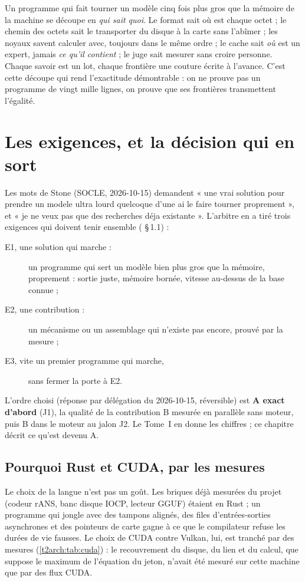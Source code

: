 \begin{enbref}
Un programme qui fait tourner un modèle cinq fois plus gros que la mémoire de la machine se découpe en \emph{qui sait quoi}. Le format sait où est chaque octet ; le chemin des octets sait le transporter du disque à la carte sans l'abîmer ; les noyaux savent calculer avec, toujours dans le même ordre ; le cache sait \emph{où} est un expert, jamais \emph{ce qu'il contient} ; le juge sait mesurer sans croire personne. Chaque savoir est un lot, chaque frontière une couture écrite à l'avance. C'est cette découpe qui rend l'exactitude démontrable : on ne prouve pas un programme de vingt mille lignes, on prouve que ses frontières transmettent l'égalité.
\end{enbref}

\section{Les exigences, et la décision qui en sort}\label{t2arch:sec:exigences}

Les mots de Stone (SOCLE, 2026-10-15) demandent « une vrai solution pour prendre un modele ultra lourd quelcoque d'une ai le faire tourner proprement », et « je ne veux pas que des recherches déja existante ». L'arbitre en a tiré trois exigences qui doivent tenir ensemble ( §\,1.1) :
\begin{description}
\item[E1, une solution qui marche :] un programme qui sert un modèle bien plus gros que la mémoire, proprement : sortie juste, mémoire bornée, vitesse au-dessus de la base connue ;
\item[E2, une contribution :] un mécanisme ou un assemblage qui n'existe pas encore, prouvé par la mesure ;
\item[E3, vite un premier programme qui marche,] sans fermer la porte à E2.
\end{description}
L'ordre choisi (réponse par délégation du 2026-10-15, réversible) est \textbf{A exact d'abord} (J1), la qualité de la contribution B mesurée en parallèle sans moteur, puis B dans le moteur au jalon J2. Le Tome~I en donne les chiffres ; ce chapitre décrit ce qu'est devenu A.

\subsection{Pourquoi Rust et CUDA, par les mesures}

Le choix de la langue n'est pas un goût. Les briques déjà mesurées du projet (codeur rANS, banc disque IOCP, lecteur GGUF) étaient en Rust ; un programme qui jongle avec des tampons alignés, des files d'entrées-sorties asynchrones et des pointeurs de carte gagne à ce que le compilateur refuse les durées de vie fausses. Le choix de CUDA contre Vulkan, lui, est tranché par des mesures (\cref{t2arch:tab:cuda}) : le recouvrement du disque, du lien et du calcul, que suppose le maximum de l'équation du jeton, n'avait été mesuré sur cette machine que par des flux CUDA.


